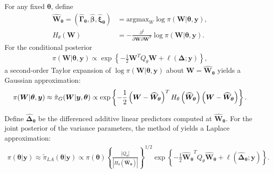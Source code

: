 \documentclass[ba]{imsart}
\begin{document}
For any fixed $\boldsymbol{\theta}$, define
\begin{equation}\begin{aligned}\label{eqn:modeandhessian}
\boldsymbol{\widehat{W}_{\theta}} = \left(\boldsymbol{\widehat{\Gamma}_{\theta}},\boldsymbol{\widehat{\beta}},\boldsymbol{\widehat{\xi}_{\theta}}\right) &= \text{argmax}_{W}\log\pi(\boldsymbol{W}|\boldsymbol{\theta},\boldsymbol{y}) , \\ 
H_{\theta}(\boldsymbol{W}) &= -\frac{\partial^{2}}{\partial \boldsymbol{W} \partial \boldsymbol{W}^{T}}\log\pi(\boldsymbol{W}|\boldsymbol{\theta},\boldsymbol{y}).
\end{aligned}\end{equation}
For the conditional posterior
\begin{equation}\begin{aligned}\label{eqn:condpost}
\pi(\boldsymbol{W}|\boldsymbol{\theta},\boldsymbol{y}) \propto \exp\left\lbrace -\frac{1}{2}\boldsymbol{W}^{T}Q_{\theta}\boldsymbol{W} + \ell\left(\boldsymbol{\Delta};\boldsymbol{y}\right)\right\rbrace,
\end{aligned}\end{equation}
a second-order Taylor expansion of $\log\pi(\boldsymbol{W}|\boldsymbol{\theta},\boldsymbol{y})$ about $\boldsymbol{W} = \boldsymbol{\widehat{W}_{\theta}}$ yields a Gaussian approximation:
\begin{equation}\label{eqn:gaussianapprox}
\pi(\boldsymbol{W}|\boldsymbol{\theta},\boldsymbol{y}) \approx \tilde{\pi}_{G}(\boldsymbol{W}|\boldsymbol{y},\boldsymbol{\theta}) \propto \text{exp}\left\{-\frac{1}{2} \left(\boldsymbol{W}-\boldsymbol{\widehat{W}_{\theta}} \right)^T H_\theta\left(\boldsymbol{\widehat{W}_{\theta}}\right) \left(\boldsymbol{W}-\boldsymbol{\widehat{W}_{\theta}} \right) \right\}. \\
\end{equation}


Define $\boldsymbol{\widehat{\Delta}_{\theta}}$ be the differenced additive linear predictors computed at $\boldsymbol{\widehat{W}_{\theta}}$. For the joint posterior of the variance parameters, the method of \cite{tierney} yields a Laplace approximation:
\begin{equation}\begin{aligned}\label{eqn:laplace}
\pi(\boldsymbol{\theta}|\boldsymbol{y}) \approx \tilde{\pi}_{LA}(\boldsymbol{\theta}|\boldsymbol{y}) \propto \pi(\boldsymbol{\theta})\left\{\frac{\left|Q_{\theta}\right|}{\left|H_{\theta}\left(\boldsymbol{\widehat{W}_{\theta}}\right)\right|}\right\}^{1/2}\exp\left\{ -\frac{1}{2}\boldsymbol{\widehat{W}_{\theta}}^{T}Q_{\theta}\boldsymbol{\widehat{W}_{\theta}} + \ell\left(\boldsymbol{\widehat{\Delta}_{\theta}};\boldsymbol{y} \right)\right\}.
\end{aligned}\end{equation}
\end{document}
